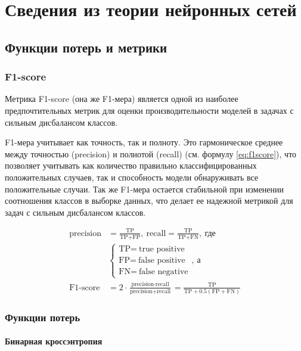 \chapter{Сведения из теории нейронных сетей}

\section{Функции потерь и метрики}
\subsection{F1-score}
Метрика F1-score (она же F1-мера) является одной из наиболее предпочтительных метрик для оценки
производительности моделей в задачах с сильным дисбалансом классов.

F1-мера учитывает как точность, так и полноту. Это гармоническое среднее между
точностью (precision) и полнотой (recall) (см. формулу \ref{eq:f1score}), что позволяет
учитывать как количество правильно классифицированных положительных случаев,
так и способность модели обнаруживать все положительные случаи. Так же F1-мера
остается стабильной при изменении соотношения классов в выборке данных, что
делает ее надежной метрикой для задач с сильным дисбалансом классов.

\begin{align}
	\text{precision} & = \frac{\text{TP}}{\text{TP} + \text{FP}}, \: \text{recall} = \frac{\text{TP}}{\text{TP} + \text{FN}}, \: \text{где} \\
	          & \begin{cases}
				    \text{TP} = \: \text{true positive}  \\
					\text{FP} = \: \text{false positive} \\
					\text{FN} = \: \text{false negative}
	            \end{cases}, \: \text{а} \\
	\text{F1-score}  & = 2 \cdot \frac{\text{precision} \cdot \text{recall}}{\text{precision} + \text{recall}} = \frac{\text{TP}}{\text{TP} + 0.5(\text{FP} + \text{FN})}
	\label{eq:f1score}
\end{align}

\subsection{Функции потерь}
\subsubsection{Бинарная кроссэнтропия}

